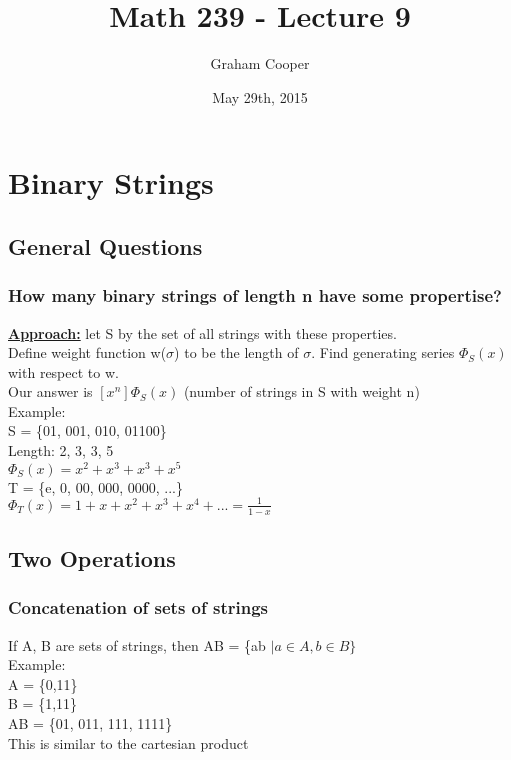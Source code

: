 \documentclass[12pt]{article}
\title{\vspace{-15ex}Math 239 - Lecture 9\vspace{-1ex}}
\date{May 29th, 2015}
\author{Graham Cooper}
\newcommand{\myt}[1]{\textbf{\underline{#1}}}
\begin{document}
	\maketitle
	
	\section*{Binary Strings}
	
	\subsection*{General Questions}
	
	\subsubsection*{How many binary strings of length n have some propertise?}
	
	\myt{Approach:} let S by the set of all strings with these properties.\\
	Define weight function w($\sigma$) to be the length of $\sigma$. 
	Find generating series $\Phi_S(x)$ with respect to w.\\
	Our answer is $[x^n]\Phi_S(x)$ (number of strings in S with weight n)\\
	
	Example:\\
	S = \{01, 001, 010, 01100\}\\
	Length: 2, 3, 3, 5\\
	$\Phi_S(x) = x^2 + x^3 + x^3 + x^5$\\
	
	T = \{e, 0, 00, 000, 0000, ...\}\\
	$\Phi_T(x) = 1 + x + x^2 + x^3 + x^4 + ... = \frac{1}{1-x}$\\
	
	\subsection*{Two Operations}
	
	\subsubsection*{Concatenation of sets of strings}
	If A, B are sets of strings, then AB = \{ab $| a \in A, b \in B\}$\\
	
	Example:\\
	A = \{0,11\}\\
	B = \{1,11\}\\
	AB = \{01, 011, 111, 1111\}\\
	This is similar to the cartesian product\\
	
\end{document}
